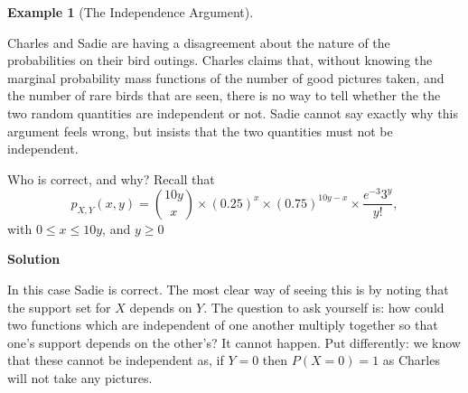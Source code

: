 \documentclass[
  letterpaper,
  DIV=11,
  numbers=noendperiod]{scrreprt}
\theoremstyle{definition}
\theoremstyle{definition}
\newtheorem{example}{Example}[chapter]
\theoremstyle{definition}
\theoremstyle{remark}
\begin{document}
\begin{example}[The Independence
Argument]\protect\hypertarget{exm-independence-arg}{}\label{exm-independence-arg}

Charles and Sadie are having a disagreement about the nature of the
probabilities on their bird outings. Charles claims that, without
knowing the marginal probability mass functions of the number of good
pictures taken, and the number of rare birds that are seen, there is no
way to tell whether the the two random quantities are independent or
not. Sadie cannot say exactly why this argument feels wrong, but insists
that the two quantities must not be independent.

Who is correct, and why? Recall that
\[p_{X,Y}(x, y) = \binom{10y}{x}\times(0.25)^{x}\times(0.75)^{10y - x}\times\frac{e^{-3}3^y}{y!},\]
with \(0 \leq x \leq 10y\), and \(y \geq 0\)

\begin{tcolorbox}[enhanced jigsaw, colback=white, colframe=quarto-callout-color-frame, arc=.35mm, leftrule=.75mm, rightrule=.15mm, opacityback=0, breakable, bottomrule=.15mm, left=2mm, toprule=.15mm]

\vspace{-3mm}\textbf{Solution}\vspace{3mm}

In this case Sadie is correct. The most clear way of seeing this is by
noting that the support set for \(X\) depends on \(Y\). The question to
ask yourself is: how could two functions which are independent of one
another multiply together so that one's support depends on the other's?
It cannot happen. Put differently: we know that these cannot be
independent as, if \(Y=0\) then \(P(X=0)=1\) as Charles will not take
any pictures.

\end{tcolorbox}

\end{example}
\end{document}
